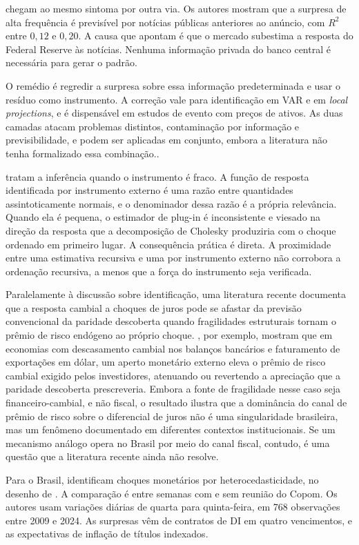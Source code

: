 \documentclass[preprint,authoryear,review,12pt]{elsarticle}
\begin{document}
\cite{bauer2023} chegam ao mesmo sintoma por outra via. Os autores mostram que a surpresa de alta frequência é previsível por notícias públicas anteriores ao anúncio, com $R^2$ entre $0{,}12$ e $0{,}20$. A causa que apontam é que o mercado subestima a resposta do Federal Reserve às notícias. Nenhuma informação privada do banco central é necessária para gerar o padrão.

O remédio é regredir a surpresa sobre essa informação predeterminada e usar o resíduo como instrumento. A correção vale para identificação em VAR e em \textit{local projections}, e é dispensável em estudos de evento com preços de ativos. As duas camadas atacam problemas distintos, contaminação por informação e previsibilidade, e podem ser aplicadas em conjunto, embora a literatura não tenha formalizado essa combinação..

\cite{montielolea} tratam a inferência quando o instrumento é fraco. A função de resposta identificada por instrumento externo é uma razão entre quantidades assintoticamente normais, e o denominador dessa razão é a própria relevância. Quando ela é pequena, o estimador de plug-in é inconsistente e viesado na direção da resposta que a decomposição de Cholesky produziria com o choque ordenado em primeiro lugar. A consequência prática é direta. A proximidade entre uma estimativa recursiva e uma por instrumento externo não corrobora a ordenação recursiva, a menos que a força do instrumento seja verificada.

Paralelamente à discussão sobre identificação, uma literatura recente documenta que a resposta cambial a choques de juros pode se afastar da previsão convencional da paridade descoberta quando fragilidades estruturais tornam o prêmio de risco endógeno ao próprio choque. \cite{dalgicozhan2026}, por exemplo, mostram que em economias com descasamento cambial nos balanços bancários e faturamento de exportações em dólar, um aperto monetário externo eleva o prêmio de risco cambial exigido pelos investidores, atenuando ou revertendo a apreciação que a paridade descoberta prescreveria. Embora a fonte de fragilidade nesse caso seja financeiro-cambial, e não fiscal, o resultado ilustra que a dominância do canal de prêmio de risco sobre o diferencial de juros não é uma singularidade brasileira, mas um fenômeno documentado em diferentes contextos institucionais. Se um mecanismo análogo opera no Brasil por meio do canal fiscal, contudo, é uma questão que a literatura recente ainda não resolve.

Para o Brasil, \cite{goncalves2025} identificam choques monetários por heterocedasticidade, no desenho de \cite{rigobon2003}. A comparação é entre semanas com e sem reunião do Copom. Os autores usam variações diárias de quarta para quinta-feira, em 768 observações entre 2009 e 2024. As surpresas vêm de contratos de DI em quatro vencimentos, e as expectativas de inflação de títulos indexados.
\end{document}
